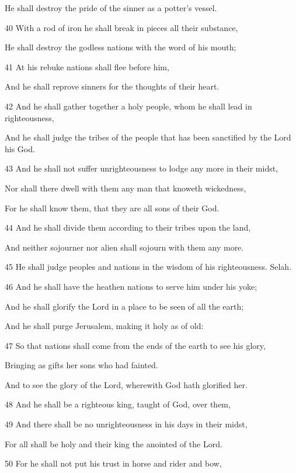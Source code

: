 \par  He shall destroy the pride of the sinner as a potter's vessel.
\par 40 With a rod of iron he shall break in pieces all their substance,
\par  He shall destroy the godless nations with the word of his mouth;
\par 41 At his rebuke nations shall flee before him,
\par  And he shall reprove sinners for the thoughts of their heart.
\par    
\par 42 And he shall gather together a holy people, whom he shall lead in righteousness,
\par  And he shall judge the tribes of the people that has been sanctified by the Lord his God.
\par 43 And he shall not suffer unrighteousness to lodge any more in their midst,
\par  Nor shall there dwell with them any man that knoweth wickedness,
\par  For he shall know them, that they are all sons of their God.
\par 44 And he shall divide them according to their tribes upon the land,
\par  And neither sojourner nor alien shall sojourn with them any more.
\par 45 He shall judge peoples and nations in the wisdom of his righteousness. Selah.
\par    
\par 46 And he shall have the heathen nations to serve him under his yoke;
\par  And he shall glorify the Lord in a place to be seen of all the earth;
\par  And he shall purge Jerusalem, making it holy as of old:
\par 47 So that nations shall come from the ends of the earth to see his glory,
\par  Bringing as gifts her sons who had fainted.
\par  And to see the glory of the Lord, wherewith God hath glorified her.
\par 48 And he shall be a righteous king, taught of God, over them,
\par 49 And there shall be no unrighteousness in his days in their midst,
\par  For all shall be holy and their king the anointed of the Lord.
\par 50 For he shall not put his trust in horse and rider and bow,
